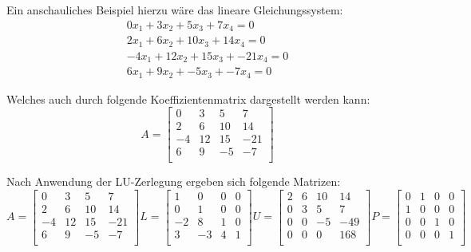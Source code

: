\documentclass[course=erap]{aspdoc}
\begin{document}
Ein anschauliches Beispiel hierzu wäre das lineare Gleichungssystem:
\begin{eqnarray}
0x_1 + 3x_2 + 5x_3 + 7x_4 = 0 \\
2x_1 + 6x_2 + 10x_3 + 14x_4 = 0\\
-4x_1 + 12x_2 + 15x_3 + -21x_4 = 0\\
6x_1 + 9x_2 + -5x_3 + -7x_4 = 0
\end{eqnarray}


Welches auch durch folgende Koeffizientenmatrix dargestellt werden kann:
\begin{equation}
A = \begin{bmatrix}
 0	& 3	 & 5  & 7 \\
 2	& 6	 & 10 & 14 \\
-4	& 12 & 15 & -21\\
 6	& 9  & -5 & -7\\
 \end{bmatrix}
\end{equation}



Nach Anwendung der LU-Zerlegung ergeben sich folgende Matrizen:
 \begin{equation}

 A = \begin{bmatrix}
 0	& 3	 & 5  & 7 \\
 2	& 6	 & 10 & 14 \\
-4	& 12 & 15 & -21\\
 6	& 9  & -5 & -7\\
 \end{bmatrix}
  L =
 \begin{bmatrix}
 1	& 0	 & 0  & 0 \\
 0	& 1	 & 0 & 0 \\
-2	& 8 & 1 & 0\\
 3	& -3  & 4 & 1\\
 \end{bmatrix}
 U =
\begin{bmatrix}
 2	& 6	 & 10 & 14 \\
 0	& 3	 & 5 &  7 \\
 0	& 0  & -5 & -49\\
 0	& 0  & 0 &  168\\
 \end{bmatrix}
 P =
 \begin{bmatrix}
 0	& 1	 & 0 & 0 \\
 1	& 0	 & 0 & 0 \\
 0	& 0  & 1 & 0\\
 0	& 0  & 0 & 1\\
 \end{bmatrix}
 \end{equation}
 
\end{document}
